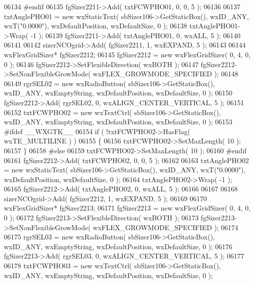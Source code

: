 \begin{DoxyCode}
06134 \textcolor{preprocessor}{    #endif}
06135     fgSizer2211->Add( txtFCWPHO01, 0, 0, 5 );
06136     
06137     txtAnglePHO01 = \textcolor{keyword}{new} wxStaticText( sbSizer106->GetStaticBox(), wxID\_ANY, wxT(\textcolor{stringliteral}{"0.0000"}), 
      wxDefaultPosition, wxDefaultSize, 0 );
06138     txtAnglePHO01->Wrap( -1 );
06139     fgSizer2211->Add( txtAnglePHO01, 0, wxALL, 5 );
06140     
06141     
06142     sizerNCOgrid->Add( fgSizer2211, 1, wxEXPAND, 5 );
06143     
06144     wxFlexGridSizer* fgSizer2212;
06145     fgSizer2212 = \textcolor{keyword}{new} wxFlexGridSizer( 0, 4, 0, 0 );
06146     fgSizer2212->SetFlexibleDirection( wxBOTH );
06147     fgSizer2212->SetNonFlexibleGrowMode( wxFLEX\_GROWMODE\_SPECIFIED );
06148     
06149     rgrSEL02 = \textcolor{keyword}{new} wxRadioButton( sbSizer106->GetStaticBox(), wxID\_ANY, wxEmptyString, wxDefaultPosition, 
      wxDefaultSize, 0 );
06150     fgSizer2212->Add( rgrSEL02, 0, wxALIGN\_CENTER\_VERTICAL, 5 );
06151     
06152     txtFCWPHO02 = \textcolor{keyword}{new} wxTextCtrl( sbSizer106->GetStaticBox(), wxID\_ANY, wxEmptyString, wxDefaultPosition, 
      wxDefaultSize, 0 );
06153 \textcolor{preprocessor}{    #ifdef \_\_WXGTK\_\_}
06154     \textcolor{keywordflow}{if} ( !txtFCWPHO02->HasFlag( wxTE\_MULTILINE ) )
06155     \{
06156     txtFCWPHO02->SetMaxLength( 10 );
06157     \}
06158 \textcolor{preprocessor}{    #else}
06159     txtFCWPHO02->SetMaxLength( 10 );
06160 \textcolor{preprocessor}{    #endif}
06161     fgSizer2212->Add( txtFCWPHO02, 0, 0, 5 );
06162     
06163     txtAnglePHO02 = \textcolor{keyword}{new} wxStaticText( sbSizer106->GetStaticBox(), wxID\_ANY, wxT(\textcolor{stringliteral}{"0.0000"}), 
      wxDefaultPosition, wxDefaultSize, 0 );
06164     txtAnglePHO02->Wrap( -1 );
06165     fgSizer2212->Add( txtAnglePHO02, 0, wxALL, 5 );
06166     
06167     
06168     sizerNCOgrid->Add( fgSizer2212, 1, wxEXPAND, 5 );
06169     
06170     wxFlexGridSizer* fgSizer2213;
06171     fgSizer2213 = \textcolor{keyword}{new} wxFlexGridSizer( 0, 4, 0, 0 );
06172     fgSizer2213->SetFlexibleDirection( wxBOTH );
06173     fgSizer2213->SetNonFlexibleGrowMode( wxFLEX\_GROWMODE\_SPECIFIED );
06174     
06175     rgrSEL03 = \textcolor{keyword}{new} wxRadioButton( sbSizer106->GetStaticBox(), wxID\_ANY, wxEmptyString, wxDefaultPosition, 
      wxDefaultSize, 0 );
06176     fgSizer2213->Add( rgrSEL03, 0, wxALIGN\_CENTER\_VERTICAL, 5 );
06177     
06178     txtFCWPHO03 = \textcolor{keyword}{new} wxTextCtrl( sbSizer106->GetStaticBox(), wxID\_ANY, wxEmptyString, wxDefaultPosition, 
      wxDefaultSize, 0 );

\end{DoxyCode}
